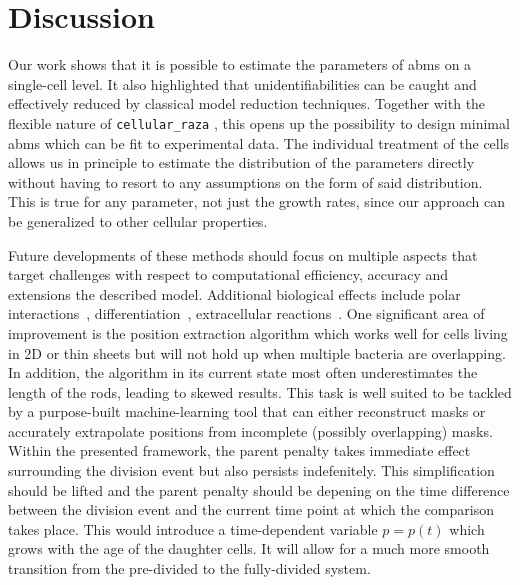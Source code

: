 \section{Discussion}

Our work shows that it is possible to estimate the parameters of \acp{abm} on a
single-cell level.
It also highlighted that unidentifiabilities can be caught and effectively reduced by classical
model reduction techniques.
Together with the flexible nature of \texttt{cellular\_raza} \cite{Pleyer2025}, this
opens up the
possibility to design minimal \acp{abm} which can be fit to experimental data.
The individual treatment of the cells allows us in principle to estimate the distribution of the
parameters directly without having to resort to any assumptions on the form of said
distribution.
This is true for any parameter, not just the growth rates, since our approach can be
generalized to
other cellular properties.

Future developments of these methods should focus on multiple aspects that target
challenges with
respect to computational efficiency, accuracy and extensions the described model.
Additional biological effects include polar interactions~\cite{Duvernoy2018},
differentiation~\cite{vanGestel2015}, extracellular reactions~\cite{Li2025}.
One significant area of improvement is the position extraction algorithm which works
well for cells living
in 2D or thin sheets but will not hold up when multiple bacteria are overlapping.
In addition, the algorithm in its current state most often underestimates the length
of the rods,
leading to skewed results.
This task is well suited to be tackled by a purpose-built machine-learning tool that can either
reconstruct masks or accurately extrapolate positions from incomplete (possibly
overlapping) masks.
Within the presented framework, the parent penalty takes immediate effect surrounding
the division
event but also persists indefenitely.
This simplification should be lifted and the parent penalty should be depening on the time
difference between the division event and the current time point at which the comparison takes
place.
This would introduce a time-dependent variable $p=p(t)$ which grows with the age of
the daughter cells.
It will allow for a much more smooth transition from the pre-divided to the
fully-divided system.

